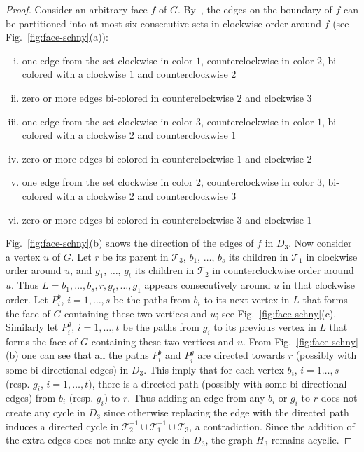 \documentclass{article}
\newcommand{\TT}{{\mathcal{T}}}
\begin{document}
\begin{proof}
Consider an arbitrary face $f$ of $G$. By~\cite{FZ08}, the edges on the boundary of $f$ can be
 partitioned into at most six consecutive sets in clockwise order around $f$
 (see Fig.~\ref{fig:face-schny}(a)):


\begin{enumerate}[(i)]
	\item one edge from the set {clockwise in color $1$, counterclockwise in color $2$, bi-colored with
		a clockwise $1$ and counterclockwise $2$}
	\item zero or more edges bi-colored in counterclockwise $2$ and clockwise $3$
	\item one edge from the set {clockwise in color $3$, counterclockwise in color $1$, bi-colored with
		a clockwise $2$ and counterclockwise $1$}
	\item zero or more edges bi-colored in counterclockwise $1$ and clockwise $2$
	\item one edge from the set {clockwise in color $2$, counterclockwise in color $3$, bi-colored with
		a clockwise $2$ and counterclockwise $3$}
	\item zero or more edges bi-colored in counterclockwise $3$ and clockwise $1$

\end{enumerate}


Fig.~\ref{fig:face-schny}(b) shows the direction of the edges of $f$ in $D_3$. Now consider a vertex $u$
 of $G$. Let $r$ be its parent in $\TT_3$, $b_1$, $\ldots$, $b_s$ its children in $\TT_1$ in clockwise order
 around $u$, and $g_1$, $\ldots$, $g_t$ its children in $\TT_2$ in counterclockwise order around $u$.
 Thus $L=b_1, \ldots, b_s, r, g_t, \ldots, g_1$ appears consecutively around $u$ in that clockwise order.
 Let $P^b_i$, $i=1, \ldots, s$ be the paths from $b_i$ to its next vertex in $L$ that forms the face of $G$
 containing these two vertices and $u$; see Fig.~\ref{fig:face-schny}(c). Similarly let $P^g_i$, $i=1, \ldots,
 t$ be the paths from $g_i$ to its previous vertex in $L$ that forms the face of $G$ containing these two
 vertices and $u$. From Fig.~\ref{fig:face-schny}(b) one can see that all the paths $P^b_i$ and $P^g_i$
 are directed towards $r$ (possibly with some bi-directional edges) in $D_3$. This imply that for each
 vertex $b_i$, $i=1\ldots, s$ (resp. $g_i$, $i=1,\ldots, t$), there is a directed path (possibly with some
 bi-directional edges) from $b_i$ (resp. $g_i$) to $r$. Thus adding an edge from any $b_i$ or $g_i$ to $r$
 does not create any cycle in $D_3$ since otherwise replacing the edge with the directed path induces
 a directed cycle in $\TT_{2}^{-1}\cup \TT_{1}^{-1}\cup \TT_{3}$, a contradiction. Since the addition of the
 extra edges does not make any cycle in $D_3$, the graph $H_3$ remains acyclic.




\end{proof}
\end{document}
